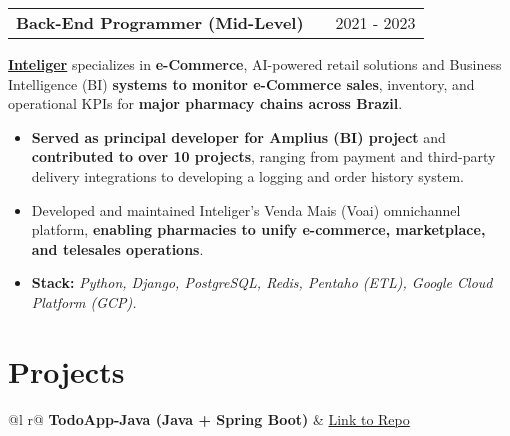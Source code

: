 \documentclass[a4paper,12pt]{article}
\makeatletter
\newenvironment{joblong}[2]
{
    \begin{tabularx}{\linewidth}{@{}l X r@{}}
        \textbf{#1} & \hfill & #2 \\[3.75pt]
    \end{tabularx}
    \begin{minipage}[t]{\linewidth}
    }
    {
    \end{minipage}
}
\newenvironment{bullets}
{
    \begin{itemize}[nosep,after=\strut, leftmargin=1em, itemsep=3pt,label=--]
    }
    {
    \end{itemize}
}
\makeatother
\begin{document}
    \begin{joblong}{Back-End Programmer (Mid-Level)}{2021 - 2023}
        \href{https://inteliger.com.br}{\textbf{Inteliger}} specializes in \textbf{e-Commerce}, AI-powered retail solutions and Business Intelligence (BI) \textbf{systems to monitor e-Commerce sales}, inventory, and operational KPIs for \textbf{major pharmacy chains across Brazil}.
        \begin{bullets}
            \item \textbf{Served as principal developer for Amplius (BI) project} and \textbf{contributed to over 10 projects}, ranging from payment and third-party delivery integrations to developing a logging and order history system.
            \item Developed and maintained Inteliger’s Venda Mais (Voai) omnichannel platform, \textbf{enabling pharmacies to unify e-commerce, marketplace, and telesales operations}.
            \item \textbf{Stack:} \textit{Python, Django, PostgreSQL, Redis, Pentaho (ETL), Google Cloud Platform (GCP).}
        \end{bullets}
    \end{joblong}



    \section{Projects}
    \begin{tabularx}{\linewidth}{ @{}l r@{} }
        \textbf{TodoApp-Java (Java + Spring Boot)} & \hfill \href{https://github.com/JoaoVLima/TodoApp-Java}{Link to Repo} \\[3.75pt]
        \\
    \end{tabularx}
\end{document}
